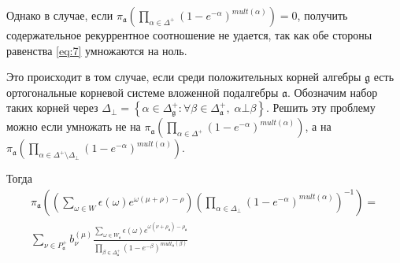 \documentclass[a4paper,12pt]{article}
\theoremstyle{definition} \newtheorem{Def}{Definition}
\begin{document}
Однако в случае, если $\pi_{\mathfrak{a}}\left(\prod_{\alpha\in \Delta^{+}}(1-e^{-\alpha})^{mult(\alpha)}\right)=0$, получить содержательное рекуррентное соотношение не удается, так как обе стороны равенства \eqref{eq:7} умножаются на ноль.

Это происходит в том случае, если среди положительных корней алгебры $\mathfrak{g}$ есть ортогональные корневой системе вложенной подалгебры $\mathfrak{a}$. Обозначим набор таких корней через $\Delta_{\bot}=\left\{\alpha\in\Delta_{\mathfrak{g}}^{+}:\forall \beta\in \Delta_{\mathfrak{a}}^{+},\; \alpha\bot\beta \right\}$. Решить эту проблему можно если умножать не на $\pi_{\mathfrak{a}}\left(\prod_{\alpha\in \Delta^{+}}(1-e^{-\alpha})^{mult(\alpha)}\right)$, а на $\pi_{\mathfrak{a}}\left(\prod_{\alpha\in \Delta^{+}\setminus \Delta_{\bot}}(1-e^{-\alpha})^{mult(\alpha)}\right)$.

Тогда
\begin{multline}
  \label{eq:9}
  \pi_{\mathfrak{a}}\left(\left(\sum_{\omega\in W}\epsilon(\omega)e^{\omega(\mu+\rho)-\rho}\right) \left(\prod_{\alpha\in \Delta_{\bot}}(1-e^{-\alpha})^{mult(\alpha)}\right)^{-1}\right)= \\
  \sum_{\nu\in P^{+}_{\mathfrak{a}}}b^{(\mu)}_{\nu}
  \frac{\sum_{\omega\in W_{\mathfrak{a}}}\epsilon(\omega)e^{\omega(\nu+\rho_{\mathfrak{a}})-\rho_{\mathfrak{a}}}}{\prod_{\beta\in \Delta_{\mathfrak{a}}^{+}}(1-e^{-\beta})^{mult_{\mathfrak{a}}(\beta)}}
\end{multline}

{}

\end{document}
